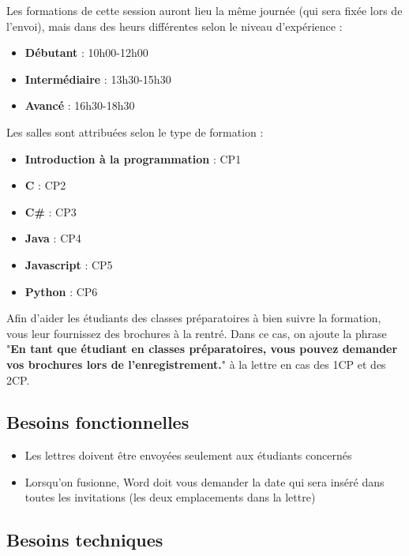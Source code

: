 \documentclass[11pt, a4paper]{article}
\begin{document}
Les formations de cette session auront lieu la même journée (qui sera fixée lors de l'envoi), mais dans des heurs différentes selon le niveau d'expérience : 
\begin{multicols}{3}
\begin{itemize}
	\item \textbf{Débutant} : 10h00-12h00
	\item \textbf{Intermédiaire} : 13h30-15h30
	\item \textbf{Avancé} : 16h30-18h30
\end{itemize}
\end{multicols}
Les salles sont attribuées selon le type de formation : 
\begin{multicols}{3}
\begin{itemize}
	\item \textbf{Introduction à la programmation} : CP1
	\item \textbf{C} : CP2
	\item \textbf{C\#} : CP3
	\item \textbf{Java} : CP4
	\item \textbf{Javascript} : CP5
	\item \textbf{Python} : CP6
\end{itemize}
\end{multicols}

Afin d'aider les étudiants des classes préparatoires à bien suivre la formation, vous leur fournissez des brochures à la rentré. Dans ce cas, on ajoute la phrase "\textbf{En tant que étudiant en classes préparatoires, vous pouvez demander vos brochures lors de l’enregistrement.}" à la lettre en cas des 1CP et des 2CP.

\subsection*{Besoins fonctionnelles}

\begin{itemize}
	\item Les lettres doivent être envoyées seulement aux étudiants concernés
	\item Lorsqu'on fusionne, Word doit vous demander la date qui sera inséré dans toutes les invitations (les deux emplacements dans la lettre)
\end{itemize}

\subsection*{Besoins techniques}
\end{document}
